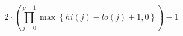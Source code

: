 \[2 \cdot \left(\prod_{j=0}^{p-1} \max\left\{ hi\left(j\right) - lo\left(j\right) + 1, 0 \right\}\right) - 1\]

